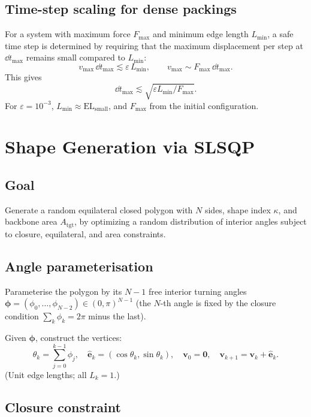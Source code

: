 \documentclass[12pt]{article}
\newcommand{\eps}{\varepsilon}
\begin{document}
\subsection{Time-step scaling for dense packings}

For a system with maximum force $F_{\max}$ and minimum edge length $L_{\min}$,
a safe time step is determined by requiring that the maximum displacement per step
at $\dd t_{\max}$ remains small compared to $L_{\min}$:
\[
  v_{\max}\,\dd t_{\max} \lesssim \eps\,L_{\min},
  \qquad v_{\max} \sim F_{\max}\,\dd t_{\max}.
\]
This gives
\[
  \dd t_{\max} \lesssim \sqrt{\eps L_{\min} / F_{\max}}.
\]
For $\eps = 10^{-3}$, $L_{\min} \approx \mathrm{EL}_{\mathrm{small}}$, and
$F_{\max}$ from the initial configuration.

\section{Shape Generation via SLSQP}

\subsection{Goal}

Generate a random equilateral closed polygon with $N$ sides, shape index $\kappa$,
and backbone area $A_{\mathrm{tgt}}$, by optimizing a random distribution of interior
angles subject to closure, equilateral, and area constraints.

\subsection{Angle parameterisation}

Parameterise the polygon by its $N-1$ free interior turning angles
$\boldsymbol{\phi} = (\phi_0, \ldots, \phi_{N-2}) \in (0, \pi)^{N-1}$ (the $N$-th angle
is fixed by the closure condition $\sum_k \phi_k = 2\pi$ minus the last).

Given $\boldsymbol{\phi}$, construct the vertices:
\[
  \theta_k = \sum_{j=0}^{k-1} \phi_j, \quad
  \hat{\mathbf{e}}_k = (\cos\theta_k, \sin\theta_k), \quad
  \mathbf{v}_0 = \mathbf{0}, \quad
  \mathbf{v}_{k+1} = \mathbf{v}_k + \hat{\mathbf{e}}_k.
\]
(Unit edge lengths; all $L_k = 1$.)

\subsection{Closure constraint}
\end{document}
